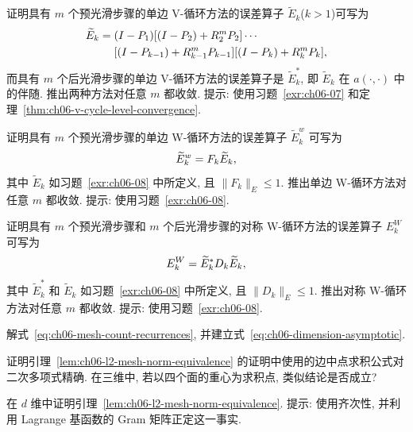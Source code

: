 \begin{MBExercise}
\label{exr:ch06-08}
证明具有 $m$ 个预光滑步骤的单边 V-循环方法的误差算子 $\widetilde E_k$($k>1$)可写为
\[
\MathBookFormulaID{formula-ch06-exercise-08-one-sided-v-cycle-product}
\begin{aligned}
\widetilde E_k={}&(I-P_1)[(I-P_2)+R_2^mP_2]\cdots\\
&[(I-P_{k-1})+R_{k-1}^mP_{k-1}][(I-P_k)+R_k^mP_k],
\end{aligned}
\]
而具有 $m$ 个后光滑步骤的单边 V-循环方法的误差算子是 $\widetilde E_k^*$, 即 $\widetilde E_k$ 在 $a(\cdot,\cdot)$ 中的伴随. 推出两种方法对任意 $m$ 都收敛. 提示: 使用习题~\ref{exr:ch06-07} 和定理~\ref{thm:ch06-v-cycle-level-convergence}.
\end{MBExercise}

\begin{MBExercise}
\label{exr:ch06-09}
证明具有 $m$ 个预光滑步骤的单边 W-循环方法的误差算子 $\widetilde E_k^w$ 可写为
\[
\MathBookFormulaID{formula-ch06-exercise-09-one-sided-w-cycle-factorization}
\widetilde E_k^w=F_k\widetilde E_k,
\]
其中 $\widetilde E_k$ 如习题~\ref{exr:ch06-08} 中所定义, 且 $\|F_k\|_E\leq1$. 推出单边 W-循环方法对任意 $m$ 都收敛. 提示: 使用习题~\ref{exr:ch06-08}.
\end{MBExercise}

\begin{MBExercise}
\label{exr:ch06-10}
证明具有 $m$ 个预光滑步骤和 $m$ 个后光滑步骤的对称 W-循环方法的误差算子 $E_k^W$ 可写为
\[
\MathBookFormulaID{formula-ch06-exercise-10-symmetric-w-cycle-factorization}
E_k^W=\widetilde E_k^*D_k\widetilde E_k,
\]
其中 $\widetilde E_k^*$ 和 $\widetilde E_k$ 如习题~\ref{exr:ch06-08} 中所定义, 且 $\|D_k\|_E\leq1$. 推出对称 W-循环方法对任意 $m$ 都收敛. 提示: 使用习题~\ref{exr:ch06-08}.
\end{MBExercise}

\begin{MBExercise}
\label{exr:ch06-11}
解式~\eqref{eq:ch06-mesh-count-recurrences}, 并建立式~\eqref{eq:ch06-dimension-asymptotic}.
\end{MBExercise}

\begin{MBExercise}
\label{exr:ch06-12}
证明引理~\ref{lem:ch06-l2-mesh-norm-equivalence} 的证明中使用的边中点求积公式对二次多项式精确. 在三维中, 若以四个面的重心为求积点, 类似结论是否成立?
\end{MBExercise}

\begin{MBExercise}
\label{exr:ch06-13}
在 $d$ 维中证明引理~\ref{lem:ch06-l2-mesh-norm-equivalence}. 提示: 使用齐次性, 并利用 Lagrange 基函数的 Gram 矩阵正定这一事实.
\end{MBExercise}

